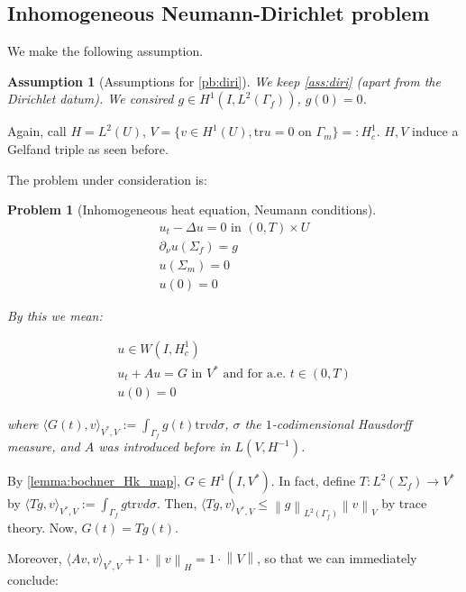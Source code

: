 \documentclass[english,a4paper,10pt,oneside]{scrbook}	%
\theoremstyle{break}
\newtheorem{ass}[equation]{Assumption}
\newtheorem{pb}[equation]{Problem}
\theoremstyle{remark}
\newcommand{\norm}[1]{\left\lVert#1\right\rVert}
\newcommand{\HN}[1]{\norm{#1}_{H}}
\newcommand{\VN}[1]{\norm{#1}_{V}}
\newcommand{\tr}{\text{tr}}
\begin{document}
\subsection{Inhomogeneous Neumann-Dirichlet problem}

We make the following assumption.

\begin{ass}[Assumptions for \cref{pb:diri}]
\label{ass:neu}
We keep \cref{ass:diri} (apart from the Dirichlet datum). We consired $g \in H^1(I, L^2(\Gamma_f))$, $g(0)=0$.
\end{ass}

Again, call $H=L^2(U)$, $V=\{ v \in H^1(U), \tr u = 0 \text{ on } \Gamma_m\}=:H^1_c$. $H,V$ induce a Gelfand triple as seen before. 


The problem under consideration is:

\begin{pb}[Inhomogeneous heat equation, Neumann conditions]
\label{pb:neu}
\begin{align}
u_t - \Delta u = 0 \text{ in } (0,T)\times U\\
\partial_\nu u(\Sigma_f)=g\\
u(\Sigma_m)=0\\
u(0)=0
\end{align}

By this we mean:

\begin{align}
u \in W(I,H^1_c) \\
u_t + A u = G \text{ in } V^* \text{ and for a.e. } t \in (0,T) \\
u(0)=0
\end{align}

where $\langle G(t), v \rangle_{V^*,V}:=\int_{\Gamma_f} g(t)\tr v d\sigma$, $\sigma$ the $1$-codimensional Hausdorff measure, and $A$ was introduced before in $L(V,H^{-1})$.

\end{pb}

By \cref{lemma:bochner_Hk_map}, $G \in H^1(I,V^*)$. In fact, define $T: L^2(\Sigma_f)\rightarrow V^*$ by $\langle Tg,v \rangle_{V^*,V}:=\int_{\Gamma_f} g\tr v d\sigma$. Then, $\langle Tg,v \rangle_{V^*,V} \leq \norm{g}_{L^2(\Gamma_f)} \VN{v}$ by trace theory. Now, $G(t)=Tg(t)$.

Moreover, $\langle A v, v \rangle_{V^*,V}+ 1 \cdot \HN{v} = 1\cdot \norm{V}$, so that we can immediately conclude:
\end{document}
